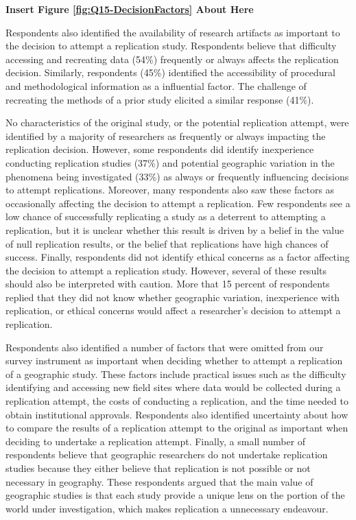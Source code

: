 \documentclass[]{interact}
\theoremstyle{plain}%
\theoremstyle{definition}
\theoremstyle{remark}
\begin{document}
\begin{center}
\textbf{Insert Figure \ref{fig:Q15-DecisionFactors} About Here}
\end{center}

Respondents also identified the availability of research artifacts as important to the decision to attempt a replication study.
Respondents believe that difficulty accessing and recreating data (54\%) frequently or always affects the replication decision.
Similarly, respondents (45\%) identified the accessibility of procedural and methodological information as a influential factor. 
The challenge of recreating the methods of a prior study elicited a similar response (41\%).

No characteristics of the original study, or the potential replication attempt, were identified by a majority of researchers as frequently or always impacting the replication decision. 
However, some respondents did identify inexperience conducting replication studies (37\%) and potential geographic variation in the phenomena being investigated (33\%) as always or frequently influencing decisions to attempt replications. 
Moreover, many respondents also saw these factors as occasionally affecting the decision to attempt a replication.
Few respondents see a low chance of successfully replicating a study as a deterrent to attempting a replication, but it is unclear whether this result is driven by a belief in the value of null replication results, or the belief that replications have high chances of success.
Finally, respondents did not identify ethical concerns as a factor affecting the decision to attempt a replication study. 
However, several of these results should also be interpreted with caution. 
More that 15 percent of respondents replied that they did not know whether geographic variation, inexperience with replication, or ethical concerns would affect a researcher's decision to attempt a replication. 

Respondents also identified a number of factors that were omitted from our survey instrument as important when deciding whether to attempt a replication of a geographic study. 
These factors include practical issues such as the difficulty identifying and accessing new field sites where data would be collected during a replication attempt, the costs of conducting a replication, and the time needed to obtain institutional approvals.
Respondents also identified uncertainty about how to compare the results of a replication attempt to the original as important when deciding to undertake a replication attempt. 
Finally, a small number of respondents believe that geographic researchers do not undertake replication studies because they either believe that replication is not possible or not necessary in geography. 
These respondents argued that the main value of geographic studies is that each study provide a unique lens on the portion of the world under investigation, which makes replication a unnecessary endeavour.   
\end{document}
